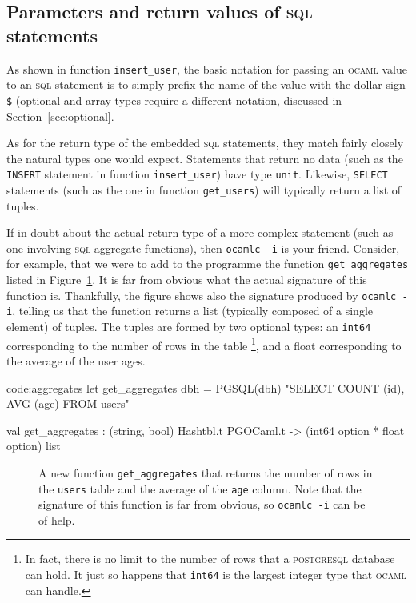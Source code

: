 \documentclass[11pt]{article}
\newcommand{\ocaml}{\textsc{ocaml}\xspace}
\newcommand{\postgresql}{\textsc{postgresql}\xspace}
\newcommand{\sql}{\textsc{sql}\xspace}
\newcommand{\displaycodesave}[1]{\fcolorbox{codeframe}{codeback}{\BUseVerbatim[numbers=right,formatcom=\color{codefront},fontsize=\footnotesize]{#1}}}
\begin{document}
\subsection{Parameters and return values of \sql statements}
\label{sec:param}

As shown in function \texttt{insert\_user}, the basic notation for passing an \ocaml
value to an \sql statement is to simply prefix the name of the value with the dollar
sign \texttt{\$} (optional and array types require a different notation, discussed
in Section~\ref{sec:optional}.

As for the return type of the embedded \sql statements, they match fairly closely
the natural types one would expect.  Statements that return no data (such as the
\texttt{INSERT} statement in function \texttt{insert\_user}) have type \texttt{unit}.
Likewise, \texttt{SELECT} statements (such as the one in function \texttt{get\_users})
will typically return a list of tuples.

If in doubt about the actual return type of a more complex statement (such as one
involving \sql aggregate functions), then \texttt{ocamlc -i} is your friend.  Consider,
for example, that we were to add to the programme the function \texttt{get\_aggregates}
listed in Figure~\ref{fig:aggregates}.  It is far from obvious what the actual
signature of this function is.  Thankfully, the figure shows also the signature
produced by \texttt{ocamlc -i}, telling us that the function returns a list (typically
composed of a single element) of tuples.  The tuples are formed by two optional types:
an \texttt{int64} corresponding to the number of rows in the table \footnote{In fact,
there is no limit to the number of rows that a \postgresql database can hold.  It just
so happens that \texttt{int64} is the largest integer type that \ocaml can handle.},
and a float corresponding to the average of the user ages.

\begin{SaveVerbatim}{code:aggregates}
let get_aggregates dbh =
    PGSQL(dbh) "SELECT COUNT (id), AVG (age) FROM users"

val get_aggregates :
    (string, bool) Hashtbl.t PGOCaml.t -> (int64 option * float option) list
\end{SaveVerbatim}

\begin{figure}[!ht]
\centering
\displaycodesave{code:aggregates}
\caption{A new function \texttt{get\_aggregates} that returns the number of rows in the \texttt{users}
table and the average of the \texttt{age} column.  Note that the signature of this function is far from
obvious, so \texttt{ocamlc -i} can be of help.}
\label{fig:aggregates}
\end{figure}
\end{document}
